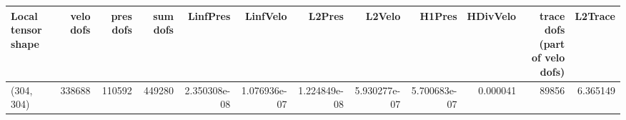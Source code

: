 \begin{tabular}{lrrrrrrrrrrr}
\toprule
Local tensor shape &  velo dofs &  pres dofs &  sum dofs &     LinfPres &     LinfVelo &       L2Pres &       L2Velo &       H1Pres &  HDivVelo &  trace dofs (part of velo dofs) &  L2Trace \\
\midrule
        (304, 304) &     338688 &     110592 &    449280 & 2.350308e-08 & 1.076936e-07 & 1.224849e-08 & 5.930277e-07 & 5.700683e-07 &  0.000041 &                           89856 & 6.365149 \\
\bottomrule
\end{tabular}
